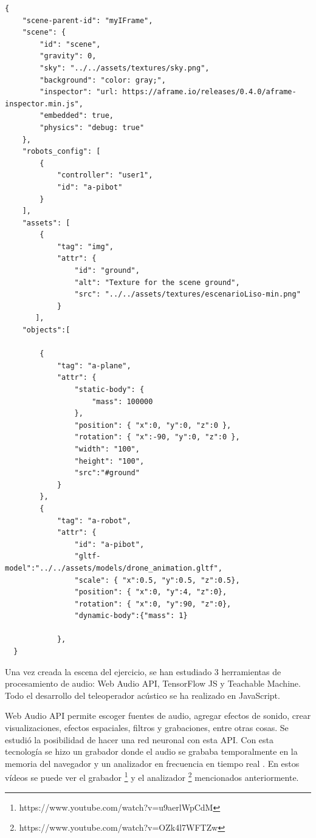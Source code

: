 \begin{lstlisting}
{
    "scene-parent-id": "myIFrame",
    "scene": {
        "id": "scene",
        "gravity": 0,
        "sky": "../../assets/textures/sky.png",
        "background": "color: gray;",
        "inspector": "url: https://aframe.io/releases/0.4.0/aframe-inspector.min.js",
        "embedded": true,
        "physics": "debug: true"
    },
    "robots_config": [
        {
            "controller": "user1",
            "id": "a-pibot"
        }
    ],
    "assets": [
        {
            "tag": "img",
            "attr": {
                "id": "ground",
                "alt": "Texture for the scene ground",
                "src": "../../assets/textures/escenarioLiso-min.png"
            }
       ],
    "objects":[
     
        {
            "tag": "a-plane",
            "attr": {
                "static-body": {
                    "mass": 100000
                },
                "position": { "x":0, "y":0, "z":0 },
                "rotation": { "x":-90, "y":0, "z":0 },
                "width": "100",
                "height": "100",
                "src":"#ground"
            }
        },
        {
            "tag": "a-robot",
            "attr": {
                "id": "a-pibot",
                "gltf-model":"../../assets/models/drone_animation.gltf",
                "scale": { "x":0.5, "y":0.5, "z":0.5},
                "position": { "x":0, "y":4, "z":0},
                "rotation": { "x":0, "y":90, "z":0},
                "dynamic-body":{"mass": 1}

            },      
  }
\end{lstlisting}


Una vez creada la escena del ejercicio, se han estudiado 3 herramientas de procesamiento de audio: Web Audio API, TensorFlow JS y Teachable Machine. Todo el desarrollo del teleoperador acústico se ha realizado en JavaScript.

Web Audio API permite escoger fuentes de audio, agregar efectos de sonido, crear visualizaciones, efectos espaciales, filtros y grabaciones, entre otras cosas.
Se estudió la  posibilidad de hacer una red neuronal con esta API. Con esta tecnología se hizo un grabador donde el audio se grababa temporalmente en la memoria del navegador y un analizador en frecuencia en tiempo real \cite{waa2} .  En estos vídeos se puede ver el grabador \footnote{https://www.youtube.com/watch?v=u9aerlWpCdM} y el analizador \footnote{https://www.youtube.com/watch?v=OZk4l7WFTZw} mencionados anteriormente.

